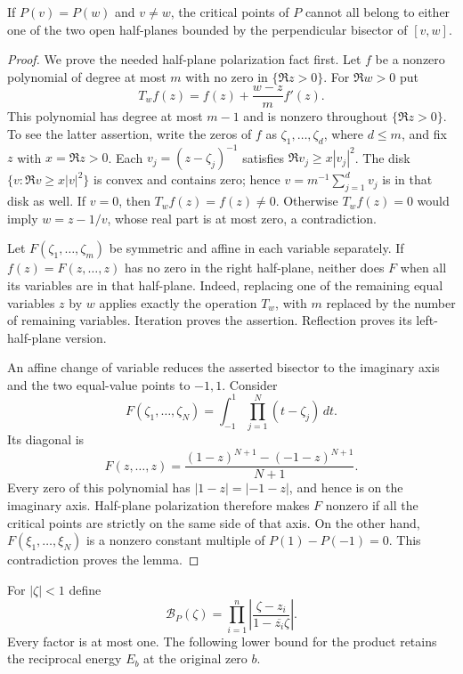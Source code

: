 \begin{lemma}\label{bc:equal-fiber}
If $P(v)=P(w)$ and $v\ne w$, the critical points of $P$ cannot all
belong to either one of the two open half-planes bounded by the
perpendicular bisector of $[v,w]$.
\end{lemma}

\begin{proof}
We prove the needed half-plane polarization fact first.  Let $f$ be a
nonzero polynomial of degree at most $m$ with no zero in
$\{\Re z>0\}$.  For $\Re w>0$ put
\[
 T_w f(z)=f(z)+\frac{w-z}{m}f'(z).
\]
This polynomial has degree at most $m-1$ and is nonzero throughout
$\{\Re z>0\}$.  To see the latter assertion, write the zeros of
$f$ as $\zeta_1,\ldots,\zeta_d$, where $d\leq m$, and fix
$z$ with $x=\Re z>0$.  Each $v_j=(z-\zeta_j)^{-1}$ satisfies
$\Re v_j\geq x|v_j|^2$.  The disk
$\{v:\Re v\geq x|v|^2\}$ is convex and contains zero; hence
$v=m^{-1}\sum_{j=1}^d v_j$ is in that disk as well.  If $v=0$,
then $T_w f(z)=f(z)\ne0$.  Otherwise $T_w f(z)=0$ would imply
$w=z-1/v$, whose real part is at most zero, a contradiction.

Let $F(\zeta_1,\ldots,\zeta_m)$ be symmetric and affine in each
variable separately.  If $f(z)=F(z,\ldots,z)$ has no zero in the
right half-plane, neither does $F$ when all its variables are in that
half-plane.  Indeed, replacing one of the remaining equal variables
$z$ by $w$ applies exactly the operation $T_w$, with $m$ replaced by
the number of remaining variables.  Iteration proves the assertion.
Reflection proves its left-half-plane version.

An affine change of variable reduces the asserted bisector to the
imaginary axis and the two equal-value points to $-1,1$.  Consider
\[
 F(\zeta_1,\ldots,\zeta_N)
   =\int_{-1}^{1}\prod_{j=1}^N(t-\zeta_j)\,dt.
\]
Its diagonal is
\[
 F(z,\ldots,z)=\frac{(1-z)^{N+1}-(-1-z)^{N+1}}{N+1}.
\]
Every zero of this polynomial has $|1-z|=|-1-z|$, and hence is on
the imaginary axis.  Half-plane polarization therefore makes $F$
nonzero if all the critical points are strictly on the same side of
that axis.  On the other hand, $F(\xi_1,\ldots,\xi_N)$ is a nonzero
constant multiple of $P(1)-P(-1)=0$.  This contradiction proves the
lemma.
\end{proof}

For $|\zeta|<1$ define
\[
 \mathcal B_P(\zeta)=
 \prod_{i=1}^n\left|\frac{\zeta-z_i}{1-\overline{z_i}\zeta}\right|.
\]
Every factor is at most one.  The following lower bound for the product
retains the reciprocal energy $E_b$ at the original zero $b$.

